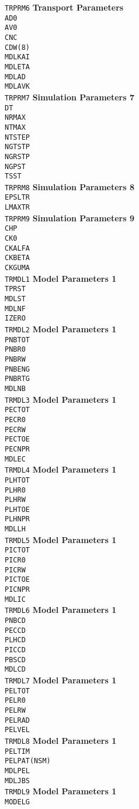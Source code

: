 \documentclass[11pt]{jarticle}
\newcommand{\inputParmBlock}[2]
{\texttt{#1} \> \> \> \textbf{#2} \\}
\newcommand{\inputParm}[4]
{\> \texttt{#1} \> [#2] \> \> #3 \' #4 \\}
\begin{document}
\begin{tabbing}
\inputParmBlock{TRPRM6}{Transport Parameters}
\inputParm{AD0}{D}{}{}
\inputParm{AV0}{D}{}{}
\inputParm{CNC}{D}{}{}
\inputParm{CDW(8)}{D}{}{}
\inputParm{MDLKAI}{D}{}{}
\inputParm{MDLETA}{D}{}{}
\inputParm{MDLAD}{D}{}{}
\inputParm{MDLAVK}{D}{}{}

\inputParmBlock{TRPRM7}{Simulation Parameters 7}
\inputParm{DT}{D}{}{}
\inputParm{NRMAX}{D}{}{}
\inputParm{NTMAX}{D}{}{}
\inputParm{NTSTEP}{D}{}{}
\inputParm{NGTSTP}{D}{}{}
\inputParm{NGRSTP}{D}{}{}
\inputParm{NGPST}{D}{}{}
\inputParm{TSST}{D}{}{}

\inputParmBlock{TRPRM8}{Simulation Parameters 8}
\inputParm{EPSLTR}{D}{}{}
\inputParm{LMAXTR}{D}{}{}

\inputParmBlock{TRPRM9}{Simulation Parameters 9}
\inputParm{CHP}{D}{}{}
\inputParm{CK0}{D}{}{}
\inputParm{CKALFA}{D}{}{}
\inputParm{CKBETA}{D}{}{}
\inputParm{CKGUMA}{D}{}{}

\inputParmBlock{TRMDL1}{Model Parameters 1}
\inputParm{TPRST}{D}{}{}
\inputParm{MDLST}{I}{}{}
\inputParm{MDLNF}{I}{}{}
\inputParm{IZERO}{I}{}{}

\inputParmBlock{TRMDL2}{Model Parameters 1}
\inputParm{PNBTOT}{D}{}{}
\inputParm{PNBR0}{D}{}{}
\inputParm{PNBRW}{D}{}{}
\inputParm{PNBENG}{D}{}{}
\inputParm{PNBRTG}{D}{}{}
\inputParm{MDLNB}{D}{}{}

\inputParmBlock{TRMDL3}{Model Parameters 1}
\inputParm{PECTOT}{D}{}{}
\inputParm{PECR0}{D}{}{}
\inputParm{PECRW}{D}{}{}
\inputParm{PECTOE}{D}{}{}
\inputParm{PECNPR}{D}{}{}
\inputParm{MDLEC}{D}{}{}

\inputParmBlock{TRMDL4}{Model Parameters 1}
\inputParm{PLHTOT}{D}{}{}
\inputParm{PLHR0}{D}{}{}
\inputParm{PLHRW}{D}{}{}
\inputParm{PLHTOE}{D}{}{}
\inputParm{PLHNPR}{D}{}{}
\inputParm{MDLLH}{D}{}{}

\inputParmBlock{TRMDL5}{Model Parameters 1}
\inputParm{PICTOT}{D}{}{}
\inputParm{PICR0}{D}{}{}
\inputParm{PICRW}{D}{}{}
\inputParm{PICTOE}{D}{}{}
\inputParm{PICNPR}{D}{}{}
\inputParm{MDLIC}{D}{}{}

\inputParmBlock{TRMDL6}{Model Parameters 1}
\inputParm{PNBCD}{D}{}{}
\inputParm{PECCD}{D}{}{}
\inputParm{PLHCD}{D}{}{}
\inputParm{PICCD}{D}{}{}
\inputParm{PBSCD}{D}{}{}
\inputParm{MDLCD}{D}{}{}

\inputParmBlock{TRMDL7}{Model Parameters 1}
\inputParm{PELTOT}{D}{}{}
\inputParm{PELR0}{D}{}{}
\inputParm{PELRW}{D}{}{}
\inputParm{PELRAD}{D}{}{}
\inputParm{PELVEL}{D}{}{}

\inputParmBlock{TRMDL8}{Model Parameters 1}
\inputParm{PELTIM}{D}{}{}
\inputParm{PELPAT(NSM)}{D}{}{}
\inputParm{MDLPEL}{D}{}{}
\inputParm{MDLJBS}{D}{}{}

\inputParmBlock{TRMDL9}{Model Parameters 1}
\inputParm{MODELG}{D}{}{}
\end{tabbing}
\end{document}
